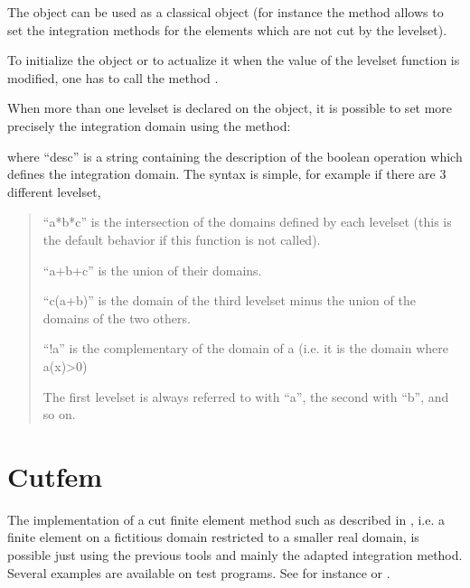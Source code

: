 \documentclass[a4paper,11pt,english]{sphinxmanual}
\begin{document}
The object  can be used as a classical  object (for instance the
method  allows to set the integration methods
for the elements which are not cut by the level\sphinxhyphen{}set).

To initialize the object or to actualize it when the value of the level\sphinxhyphen{}set
function is modified, one has to call the method .

When more than one level\sphinxhyphen{}set is declared on the  object, it is possible to set more precisely the integration domain using the method:

\begin{sphinxVerbatim}[commandchars=\\\{\}]
\end{sphinxVerbatim}

where “desc” is a string containing the description of the boolean operation which defines the integration domain. The syntax is simple, for example if there are 3 different level\sphinxhyphen{}set,
\begin{quote}

“a*b*c” is the intersection of the domains defined by each
level\sphinxhyphen{}set (this is the default behavior if this function is not
called).

“a+b+c” is the union of their domains.

“c\sphinxhyphen{}(a+b)” is the domain of the third level\sphinxhyphen{}set minus the union of
the domains of the two others.

“!a” is the complementary of the domain of a (i.e. it is the
domain where a(x)\textgreater{}0)

The first level\sphinxhyphen{}set is always referred to with “a”, the second
with “b”, and so on.
\end{quote}


\section{Cut\sphinxhyphen{}fem}
\label{\detokenize{userdoc/xfem:cut-fem}}
The implementation of a cut finite element method such as described in , i.e. a finite element on a fictitious domain restricted to a smaller real domain, is possible just using the previous tools and mainly the adapted integration method. Several examples are available on  test programs. See for instance  or .
\end{document}
